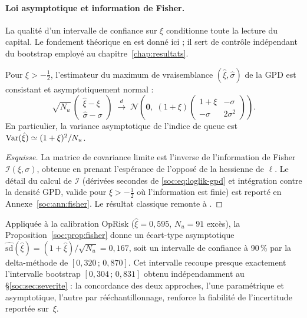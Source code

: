 \paragraph{Loi asymptotique et information de Fisher.} La qualité d'un intervalle de confiance sur $\xi$ conditionne toute la lecture du capital. Le fondement théorique en est donné ici ; il sert de contrôle indépendant du bootstrap employé au chapitre~\ref{chap:resultats}.

\begin{proposition}\label{soc:prop:fisher}
Pour $\xi > -\tfrac{1}{2}$, l'estimateur du maximum de vraisemblance $(\hat\xi,\hat\sigma)$ de la GPD est consistant et asymptotiquement normal :
\begin{equation}
\sqrt{N_u}\,\begin{pmatrix}\hat\xi-\xi\\[2pt]\hat\sigma-\sigma\end{pmatrix}
\;\xrightarrow{\;d\;}\;
\mathcal{N}\!\left(\mathbf{0},\; (1+\xi)\begin{pmatrix}1+\xi & -\sigma\\[2pt] -\sigma & 2\sigma^2\end{pmatrix}\right).
\end{equation}
En particulier, la variance asymptotique de l'indice de queue est
$\mathrm{Var}(\hat\xi)\simeq (1+\xi)^2/N_u$.
\end{proposition}

\begin{proof}[Esquisse]
La matrice de covariance limite est l'inverse de l'information de Fisher $\mathcal{I}(\xi,\sigma)$, obtenue en prenant l'espérance de l'opposé de la hessienne de $\ell$. Le détail du calcul de $\mathcal{I}$ (dérivées secondes de \eqref{soc:eq:loglik-gpd} et intégration contre la densité GPD, valide pour $\xi>-\tfrac12$ où l'information est finie) est reporté en Annexe~\ref{soc:ann:fisher}. Le résultat classique remonte à \citet{smith1987}.
\end{proof}

\noindent Appliquée à la calibration OpRisk ($\hat\xi=0{,}595$, $N_u=91$ excès), la Proposition~\ref{soc:prop:fisher} donne un écart-type asymptotique $\widehat{\mathrm{sd}}(\hat\xi)=(1+\hat\xi)/\sqrt{N_u}=0{,}167$, soit un intervalle de confiance à 90\,\% par la delta-méthode de $[0{,}320\,;\,0{,}870]$. Cet intervalle recoupe presque exactement l'intervalle bootstrap $[0{,}304\,;\,0{,}831]$ obtenu indépendamment au \S\ref{soc:sec:severite} : la concordance des deux approches, l'une paramétrique et asymptotique, l'autre par rééchantillonnage, renforce la fiabilité de l'incertitude reportée sur~$\xi$.

